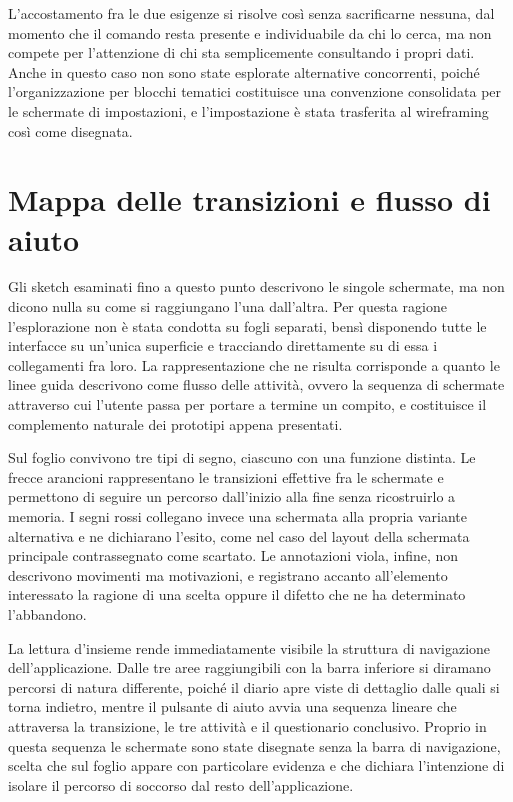L'accostamento fra le due esigenze si risolve così senza sacrificarne nessuna, dal momento che il comando resta presente e individuabile da chi lo cerca, ma non compete per l'attenzione di chi sta semplicemente consultando i propri dati.
Anche in questo caso non sono state esplorate alternative concorrenti, poiché l'organizzazione per blocchi tematici costituisce una convenzione consolidata per le schermate di impostazioni, e l'impostazione è stata trasferita al wireframing così come disegnata.

\section{Mappa delle transizioni e flusso di aiuto}
\label{sec:sketch-mappa}

Gli sketch esaminati fino a questo punto descrivono le singole schermate, ma non dicono nulla su come si raggiungano l'una dall'altra.
Per questa ragione l'esplorazione non è stata condotta su fogli separati, bensì disponendo tutte le interfacce su un'unica superficie e tracciando direttamente su di essa i collegamenti fra loro.
La rappresentazione che ne risulta corrisponde a quanto le linee guida descrivono come flusso delle attività, ovvero la sequenza di schermate attraverso cui l'utente passa per portare a termine un compito, e costituisce il complemento naturale dei prototipi appena presentati.

Sul foglio convivono tre tipi di segno, ciascuno con una funzione distinta.
Le frecce arancioni rappresentano le transizioni effettive fra le schermate e permettono di seguire un percorso dall'inizio alla fine senza ricostruirlo a memoria.
I segni rossi collegano invece una schermata alla propria variante alternativa e ne dichiarano l'esito, come nel caso del layout della schermata principale contrassegnato come scartato.
Le annotazioni viola, infine, non descrivono movimenti ma motivazioni, e registrano accanto all'elemento interessato la ragione di una scelta oppure il difetto che ne ha determinato l'abbandono.

La lettura d'insieme rende immediatamente visibile la struttura di navigazione dell'applicazione.
Dalle tre aree raggiungibili con la barra inferiore si diramano percorsi di natura differente, poiché il diario apre viste di dettaglio dalle quali si torna indietro, mentre il pulsante di aiuto avvia una sequenza lineare che attraversa la transizione, le tre attività e il questionario conclusivo.
Proprio in questa sequenza le schermate sono state disegnate senza la barra di navigazione, scelta che sul foglio appare con particolare evidenza e che dichiara l'intenzione di isolare il percorso di soccorso dal resto dell'applicazione.

